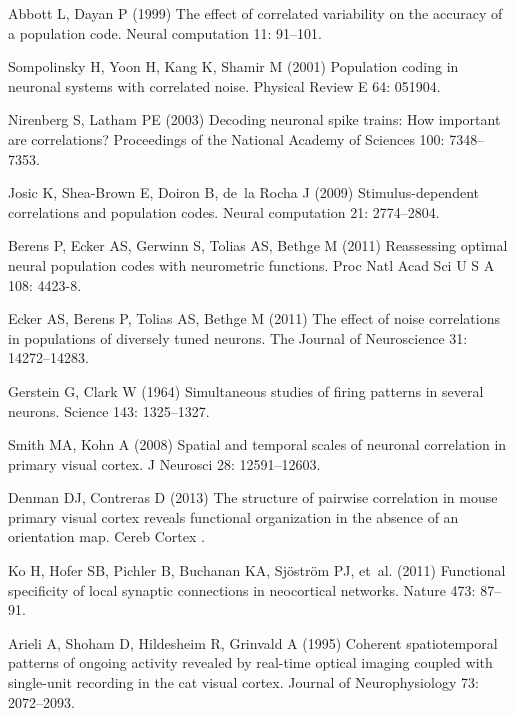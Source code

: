 \begin{thebibliography}{100}
Abbott L, Dayan P (1999) The effect of correlated variability on the accuracy
  of a population code.
\newblock Neural computation 11: 91--101.

Sompolinsky H, Yoon H, Kang K, Shamir M (2001) Population coding in neuronal
  systems with correlated noise.
\newblock Physical Review E 64: 051904.

Nirenberg S, Latham PE (2003) Decoding neuronal spike trains: How important are
  correlations?
\newblock Proceedings of the National Academy of Sciences 100: 7348--7353.

Josic K, Shea-Brown E, Doiron B, de~la Rocha J (2009) Stimulus-dependent
  correlations and population codes.
\newblock Neural computation 21: 2774--2804.

Berens P, Ecker AS, Gerwinn S, Tolias AS, Bethge M (2011) Reassessing optimal
  neural population codes with neurometric functions.
\newblock Proc Natl Acad Sci U S A 108: 4423-8.

Ecker AS, Berens P, Tolias AS, Bethge M (2011) The effect of noise correlations
  in populations of diversely tuned neurons.
\newblock The Journal of Neuroscience 31: 14272--14283.

Gerstein G, Clark W (1964) Simultaneous studies of firing patterns in several
  neurons.
\newblock Science 143: 1325--1327.

Smith MA, Kohn A (2008) Spatial and temporal scales of neuronal correlation in
  primary visual cortex.
\newblock J Neurosci 28: 12591--12603.

Denman DJ, Contreras D (2013) The structure of pairwise correlation in mouse
  primary visual cortex reveals functional organization in the absence of an
  orientation map.
\newblock Cereb Cortex .

Ko H, Hofer SB, Pichler B, Buchanan KA, Sj{\"o}str{\"o}m PJ, et~al. (2011)
  Functional specificity of local synaptic connections in neocortical networks.
\newblock Nature 473: 87--91.

Arieli A, Shoham D, Hildesheim R, Grinvald A (1995) Coherent spatiotemporal
  patterns of ongoing activity revealed by real-time optical imaging coupled
  with single-unit recording in the cat visual cortex.
\newblock Journal of Neurophysiology 73: 2072--2093.


\end{thebibliography}
